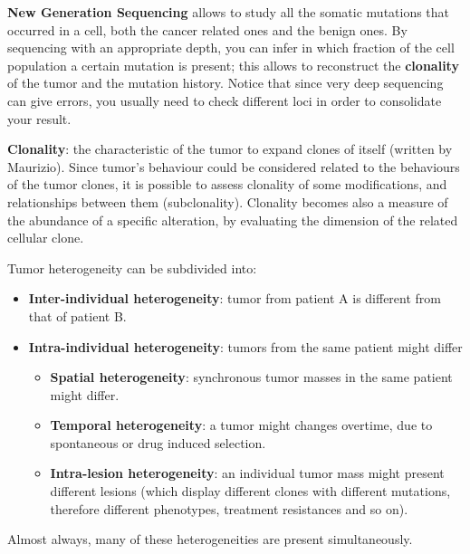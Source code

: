   \textbf{New Generation Sequencing }allows to study all the somatic mutations
  that occurred in a cell, both the cancer related ones and the benign ones. By
  sequencing with an appropriate depth, you can infer in which fraction of the
  cell population a certain mutation is present; this allows to reconstruct the
  \textbf{clonality} of the tumor and the mutation history. Notice that since
  very deep sequencing can give errors, you usually need to check different loci
  in order to consolidate your result. \\

  \begin{definition}
    \textbf{Clonality}: the characteristic of the tumor to expand clones of
    itself (written by Maurizio). Since tumor's behaviour could be considered
    related to the behaviours of the tumor clones, it is possible to assess
    clonality of some modifications, and relationships between them
    (subclonality). Clonality becomes also a measure of the abundance of a
    specific alteration, by evaluating the dimension of the related cellular
    clone.
  \end{definition}

  Tumor heterogeneity can be subdivided into: 
  \begin{itemize}
    \item \textbf{Inter-individual heterogeneity}: tumor from patient A is
    different from that of patient B.
    \item \textbf{Intra-individual heterogeneity}: tumors from the same patient
    might differ
    \begin{itemize}
      \item \textbf{Spatial heterogeneity}: synchronous tumor masses in the same
      patient might differ.
      \item \textbf{Temporal heterogeneity}: a tumor might changes overtime, due
      to spontaneous or drug induced selection.
      \item \textbf{Intra-lesion heterogeneity}: an individual tumor mass might
      present different lesions (which display different clones with different
      mutations, therefore different phenotypes, treatment resistances and so
      on).
    \end{itemize}
  \end{itemize}
  Almost always, many of these heterogeneities are present simultaneously. \\
  
